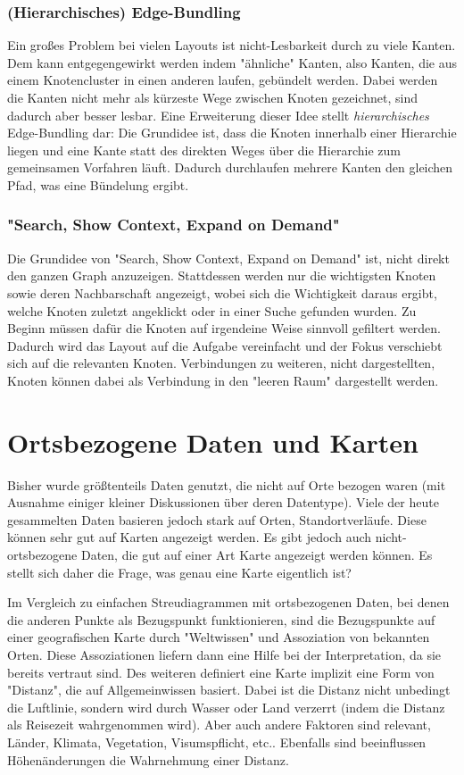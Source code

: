 			\subsubsection{(Hierarchisches) Edge-Bundling}
				Ein großes Problem bei vielen Layouts ist nicht-Lesbarkeit durch zu viele Kanten. Dem kann entgegengewirkt werden indem "ähnliche" Kanten, also Kanten, die aus einem Knotencluster in einen anderen laufen, gebündelt werden. Dabei werden die Kanten nicht mehr als kürzeste Wege zwischen Knoten gezeichnet, sind dadurch aber besser lesbar. Eine Erweiterung dieser Idee stellt \emph{hierarchisches} Edge-Bundling dar: Die Grundidee ist, dass die Knoten innerhalb einer Hierarchie liegen und eine Kante statt des direkten Weges über die Hierarchie zum gemeinsamen Vorfahren läuft. Dadurch durchlaufen mehrere Kanten den gleichen Pfad, was eine Bündelung ergibt.

			\subsubsection{"Search, Show Context, Expand on Demand"}
				Die Grundidee von "Search, Show Context, Expand on Demand" ist, nicht direkt den ganzen Graph anzuzeigen. Stattdessen werden nur die wichtigsten Knoten sowie deren Nachbarschaft angezeigt, wobei sich die Wichtigkeit daraus ergibt, welche Knoten zuletzt angeklickt oder in einer Suche gefunden wurden. Zu Beginn müssen dafür die Knoten auf irgendeine Weise sinnvoll gefiltert werden. Dadurch wird das Layout auf die Aufgabe vereinfacht und der Fokus verschiebt sich auf die relevanten Knoten. Verbindungen zu weiteren, nicht dargestellten, Knoten können dabei als Verbindung in den "leeren Raum" dargestellt werden.

	\section{Ortsbezogene Daten und Karten}
		\label{sec:karten}

		Bisher wurde größtenteils Daten genutzt, die nicht auf Orte bezogen waren (mit Ausnahme einiger kleiner Diskussionen über deren Datentype). Viele der heute gesammelten Daten basieren jedoch stark auf Orten, \bspw Standortverläufe. Diese können sehr gut auf Karten angezeigt werden. Es gibt jedoch auch nicht-ortsbezogene Daten, die gut auf einer Art Karte angezeigt werden können. Es stellt sich daher die Frage, was genau eine Karte eigentlich ist?

		Im Vergleich zu einfachen Streudiagrammen mit ortsbezogenen Daten, bei denen die anderen Punkte als Bezugspunkt funktionieren, sind die Bezugspunkte auf einer geografischen Karte durch "Weltwissen" und Assoziation von bekannten Orten. Diese Assoziationen liefern dann eine Hilfe bei der Interpretation, da sie bereits vertraut sind. Des weiteren definiert eine Karte implizit eine Form von "Distanz", die auf Allgemeinwissen basiert. Dabei ist die Distanz nicht unbedingt die Luftlinie, sondern wird \bspw durch Wasser oder Land verzerrt (indem die Distanz als Reisezeit wahrgenommen wird). Aber auch andere Faktoren sind relevant, \zB Länder, Klimata, Vegetation, Visumspflicht, etc.. Ebenfalls sind beeinflussen Höhenänderungen die Wahrnehmung einer Distanz.

